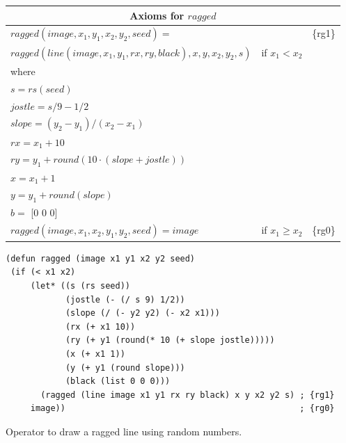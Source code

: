 \begin{figure}
\begin{center}
\begin{spacing}{0.9}
\begin{tabular}{lll}
\multicolumn{3}{c}{Axioms for $ragged$}\\
\hline
$ragged(image, x_1, y_1, x_2, y_2, seed) =$  &&\{rg1\}\\
\hspace*{8mm}$ragged(line(image, x_1, y_1, rx, ry, black), x, y, x_2, y_2, s)$ & if $x_1 < x_2$ &\\
\hspace*{4mm}where &&\\
\hspace*{4mm}$s = rs(seed)$    &&\\
\hspace*{4mm}$jostle = s/9 - 1/2$    &&\\
\hspace*{4mm}$slope = (y_2 - y_1)/(x_2 - x_1)$    &&\\
\hspace*{4mm}$rx = x_1 + 10$     &&\\
\hspace*{4mm}$ry = y_1 + round(10\cdot(slope + jostle))$ &&\\
\hspace*{4mm}$x = x_1 + 1$     &&\\
\hspace*{4mm}$y = y_1 + round(slope)$ &&\\
\hspace*{4mm}$b =$ \textsf{[0 0 0]} &&\\
$ragged(image, x_1, x_2, y_1, y_2, seed) = image$ & if $x_1 \geq x_2$ &\{rg0\}\\
\end{tabular}
\end{spacing}
\begin{code}
\begin{verbatim}
(defun ragged (image x1 y1 x2 y2 seed)
 (if (< x1 x2)
     (let* ((s (rs seed))
            (jostle (- (/ s 9) 1/2))
            (slope (/ (- y2 y2) (- x2 x1)))
            (rx (+ x1 10))
            (ry (+ y1 (round(* 10 (+ slope jostle)))))
            (x (+ x1 1))
            (y (+ y1 (round slope)))
            (black (list 0 0 0)))
       (ragged (line image x1 y1 rx ry black) x y x2 y2 s) ; {rg1}
     image))                                               ; {rg0}
\end{verbatim}
\end{code}
\end{center}
\caption{Operator to draw a ragged line using random numbers.}
\label{fig:ragged-defun}
\end{figure}

